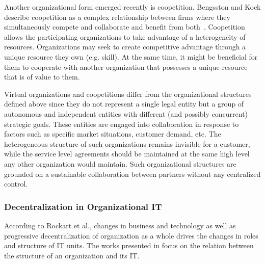 Another organizational form emerged recently is coopetition. Bengsston and Kock describe coopetition as a complex relationship between firms where they simultaneously compete and collaborate and benefit from both~\cite{Bengtsson2000}. Coopetition allows the participating organizations to take advantage of a heterogeneity of resources. Organizations may seek to create competitive advantage through a unique resource they own (e.g. skill). At the same time, it might be beneficial for them to cooperate with another organization that possesses a unique resource that is of value to them. 

Virtual organizations and coopetitions differ from the organizational structures defined above since they do not represent a single legal entity but a group of autonomous and independent entities with different (and possibly concurrent) strategic goals. These entities are engaged into collaboration in response to factors such as specific market situations, customer demand, etc.  The heterogeneous structure of such organizations remains invisible for a customer, while the service level agreements should be maintained at the same high level any other organization would maintain. Such organizational structures are grounded on a sustainable collaboration between partners without any centralized control.



\subsubsection{Decentralization in Organizational IT}
According to Rockart et al.\cite{Rockart1996}, changes in business and technology as well as progressive decentralization of organization as a whole drives the changes in roles and structure  of IT units. The works presented in \cite{fulk1995, osterloh2000, Rockart1996, Weill2004} focus on the relation between the structure of an organization and its IT. 

